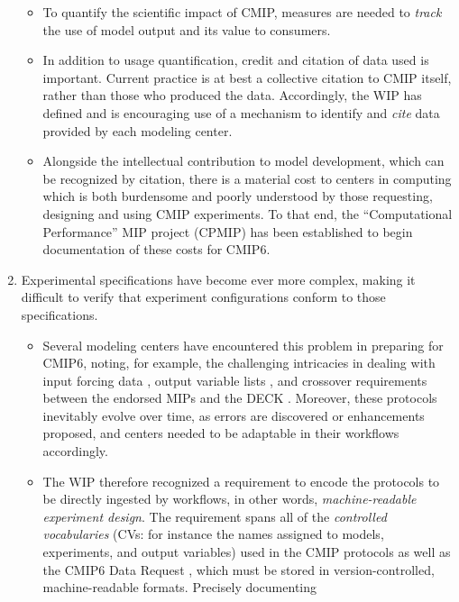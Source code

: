 \documentclass[gmd,manuscript]{copernicus}
\newcommand{\pipref}[1] {\citep{ref:#1}}
\begin{document}
\begin{enumerate}
  \begin{itemize}
  \item To quantify the scientific impact of CMIP, measures are needed
    to \emph{track} the use of model output and its value to consumers.
  \item In addition to usage quantification, credit and citation of 
    data used is important. Current practice is at best a collective 
    citation to CMIP itself, rather than those who produced the data. 
    Accordingly, the WIP has defined and is encouraging use of a 
    mechanism to identify and \emph{cite} data provided by each 
    modeling center.
  \item Alongside the intellectual contribution to model development,
    which can be recognized by citation, there is a material cost to
    centers in computing which is both burdensome and poorly
    understood by those requesting, designing and using CMIP
    experiments. To that end, the ``Computational Performance'' MIP
    project (CPMIP) \pipref{balajietal2017} has been established to 
    begin documentation of these costs for CMIP6.
  \end{itemize}
\item\label{cmplx} Experimental specifications have become ever more
  complex, making it difficult to verify that experiment
  configurations conform to those specifications.
 \begin{itemize} 
 \item Several modeling centers have encountered this problem in
   preparing for CMIP6, noting, for example, the challenging
   intricacies in dealing with input forcing data
   \citep[see][]{ref:duracketal2017}, output variable lists
   \pipref{juckesetal2015}, and crossover requirements between the
   endorsed MIPs and the DECK \pipref{eyringetal2016a} . Moreover,
   these protocols inevitably evolve over time, as errors are
   discovered or enhancements proposed, and centers needed to be 
   adaptable in their workflows accordingly.
 \item The WIP therefore recognized a requirement to encode the
   protocols to be directly ingested by workflows, in other words,
   \emph{machine-readable experiment design}. The requirement spans
   all of the \emph{controlled vocabularies} (CVs: for instance the
   names assigned to models, experiments, and output variables) used
   in the CMIP protocols as well as the CMIP6 Data Request
   \pipref{juckesetal2015}, which must be stored in
   version-controlled, machine-readable formats. Precisely documenting

\end{itemize}
\end{enumerate}
\end{document}
